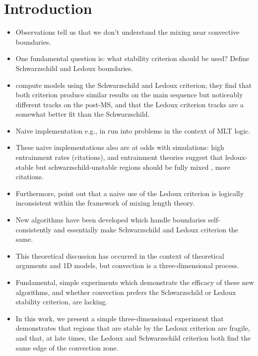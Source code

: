 
\section{Introduction}
\label{sec:introduction}

\begin{itemize}
    \item Observations tell us that we don't understand the mixing near convective boundaries.
    \item One fundamental question is: what stability criterion should be used? Define Schwarzschild and Ledoux boundaries.
    \item \citet{georgy_etal_2021} compute models using the Schwarzschild and Ledoux criterion; they find that both criterion produce similar results on the main sequence but noticeably different tracks on the post-MS, and that the Ledoux criterion tracks are a somewhat better fit than the Schwarzschild.    
    \item Naive implementation e.g., in \citet{mesa2} run into problems in the context of MLT logic.
    \item These naive implementations also are at odds with simulations: high entrainment rates (citations), and entrainment theories suggest that ledoux-stable but schwarzschild-unstable regions should be fully mixed \citep{fuentes_cumming_2020}, more citations.
    \item Furthermore, \citet{gabriel_etal_2014} point out that a naive use of the Ledoux criterion is logically inconsistent within the framework of mixing length theory.
    \item New algorithms \citep{mesa4, mesa5} have been developed which handle boundaries self-consistently and essentially make Schwarzschild and Ledoux criterion the same.
    \item This theoretical discussion has occurred in the context of theoretical arguments and 1D models, but convection is a three-dimensional process.
    \item Fundamental, simple experiments which demonstrate the efficacy of these new algorithms, and whether convection prefers the Schwarzschild or Ledoux stability criterion, are lacking.
    \item In this work, we present a simple three-dimensional experiment that demonstrates that regions that are stable by the Ledoux criterion are fragile, and that, at late times, the Ledoux and Schwarzschild criterion both find the same edge of the convection zone.
\end{itemize}

